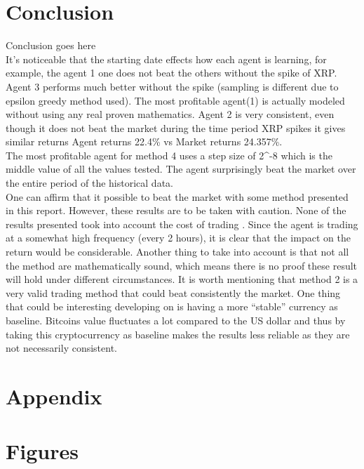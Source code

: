 \documentclass[a4paper,12pt]{article}
\begin{document}
\section{Conclusion}
Conclusion goes here\\
It’s noticeable that the starting date effects how each agent is learning, for example, the agent 1 one does not beat the others without the spike of XRP. Agent 3 performs much better without the spike (sampling is different due to epsilon greedy method used). The most profitable agent(1) is actually modeled without using any real proven mathematics. Agent 2 is very consistent, even though it does not beat the market during the time period XRP spikes it gives similar returns Agent returns 22.4\% vs Market returns 24.357\%.\\
The most profitable agent for method 4 uses a step size of 2^{-8} which is the middle value of all the values tested. The agent surprisingly beat the market over the entire period of the historical data. \\
One can affirm that it possible to beat the market with some method presented in this report. However, these results are to be taken with caution. None of the results presented took into account the cost of trading . Since the agent is trading at a somewhat high frequency (every 2 hours), it is clear that the impact on the return would be considerable. Another thing to take into account is that not all the method are mathematically sound, which means there is no proof these result will hold under different circumstances. It is worth mentioning that method 2 is a very valid trading method that could beat consistently the market. One thing that could be interesting developing on is having a more “stable” currency as baseline. Bitcoins value fluctuates a lot compared to the US dollar and thus by taking this cryptocurrency as baseline makes the results less reliable as they are not necessarily consistent.  



\section{Appendix}
\appendix
{}

\section{Figures}
\end{document}
